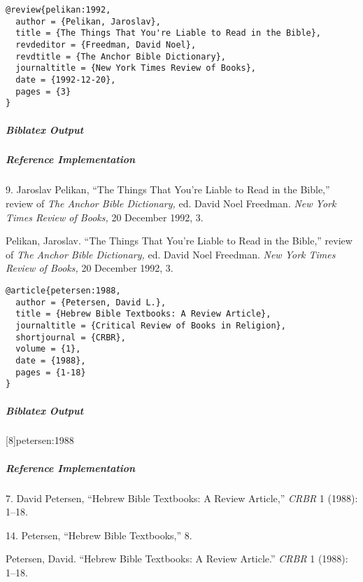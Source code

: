 \documentclass[a4paper]{article}
\newenvironment{biboutput}{%
  \subparagraph{Biblatex Output}
}{\color{black}}
\newenvironment{refimp}{%
  \subparagraph{Reference Implementation}
  \color{reference-colour}
  \rm
}{\par\color{black}}
\begin{document}
\begin{lstlisting}
@review{pelikan:1992,
  author = {Pelikan, Jaroslav},
  title = {The Things That You're Liable to Read in the Bible},
  revdeditor = {Freedman, David Noel},
  revdtitle = {The Anchor Bible Dictionary},
  journaltitle = {New York Times Review of Books},
  date = {1992-12-20},
  pages = {3}
}
\end{lstlisting}

\begin{biboutput}
\end{biboutput}

\begin{refimp}
  \hspace*{\bibindent}9. Jaroslav Pelikan, “The Things That You're Liable to
  Read in the Bible,” review of \emph{The Anchor Bible Dictionary,} ed.\@
  David Noel Freedman. \emph{New York Times Review of Books,} 20 December
  1992, 3.
  
  \hangindent\bibindent Pelikan, Jaroslav. “The Things That You're Liable to
  Read in the Bible,” review of \emph{The Anchor Bible Dictionary,} ed.\@
  David Noel Freedman. \emph{New York Times Review of Books,} 20 December
  1992, 3.
\end{refimp}

\begin{lstlisting}
@article{petersen:1988,
  author = {Petersen, David L.},
  title = {Hebrew Bible Textbooks: A Review Article},
  journaltitle = {Critical Review of Books in Religion},
  shortjournal = {CRBR},
  volume = {1},
  date = {1988},
  pages = {1-18}
}
\end{lstlisting}

\begin{biboutput}
  [8]{petersen:1988}
\end{biboutput}

\begin{refimp}
  \hspace*{\bibindent}7. David Petersen, “Hebrew Bible Textbooks: A Review
  Article,” \emph{CRBR} 1 (1988): 1–18.

  \hspace*{\bibindent}14. Petersen, “Hebrew Bible Textbooks,” 8.

  \hangindent\bibindent Petersen, David. “Hebrew Bible Textbooks: A Review
  Article.” \emph{CRBR} 1 (1988): 1–18.

\end{refimp}
\end{document}
